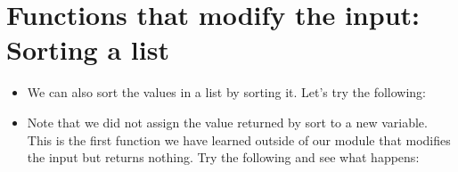 \documentclass[letterpaper,10pt,english]{sphinxmanual}
\begin{document}
\section{Functions that modify the input: Sorting a list}
\label{\detokenize{lecture_notes/lec08_lists1:functions-that-modify-the-input-sorting-a-list}}\begin{itemize}
\item {} 
We can also sort the values in a list by sorting it. Let’s try the
following:

\begin{sphinxVerbatim}[commandchars=\\\{\}]
  \PYG{p}{[}     \PYGZbs{}
\PYG{g+go}{\PYGZsq{}Saturn\PYGZsq{}, \PYGZsq{}Neptune\PYGZsq{}, \PYGZsq{}Uranus\PYGZsq{}, \PYGZsq{}Pluto\PYGZsq{}]}
\end{sphinxVerbatim}

\item {} 
Note that we did not assign the value returned by sort to a new
variable. This is the first function we have learned outside
of our  module that modifies the
input but returns nothing. Try the following and see what happens:


\end{itemize}
\end{document}
